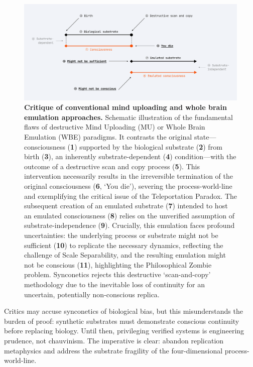 \documentclass[10pt]{article}
\begin{document}
\begin{sloppypar}
  \begin{figure}[ht!]
    \centering
    \includegraphics[width=\textwidth]{figures/mu-wbe-critique.png}
    \caption[Critique of conventional mind uploading and whole brain emulation approaches]{\textbf{Critique of conventional mind uploading and whole brain emulation approaches.} Schematic illustration of the fundamental flaws of destructive Mind Uploading (MU) or Whole Brain Emulation (WBE) paradigms. It contrasts the original state—consciousness (\textbf{1}) supported by the biological substrate (\textbf{2}) from birth (\textbf{3}), an inherently substrate-dependent (\textbf{4}) condition—with the outcome of a destructive scan and copy process (\textbf{5}). This intervention necessarily results in the irreversible termination of the original consciousness (\textbf{6}, ‘You die’), severing the process-world-line and exemplifying the critical issue of the Teleportation Paradox. The subsequent creation of an emulated substrate (\textbf{7}) intended to host an emulated consciousness (\textbf{8}) relies on the unverified assumption of substrate-independence (\textbf{9}). Crucially, this emulation faces profound uncertainties: the underlying process or substrate might not be sufficient (\textbf{10}) to replicate the necessary dynamics, reflecting the challenge of Scale Separability, and the resulting emulation might not be conscious (\textbf{11}), highlighting the Philosophical Zombie problem. Synconetics rejects this destructive ‘scan-and-copy’ methodology due to the inevitable loss of continuity for an uncertain, potentially non-conscious replica.}
    \label{fig:mu-wbe-critique}
  \end{figure}

  Critics may accuse synconetics of biological bias, but this misunderstands the burden of proof: synthetic substrates must demonstrate conscious continuity before replacing biology. Until then, privileging verified systems is engineering prudence, not chauvinism. The imperative is clear: abandon replication metaphysics and address the substrate fragility of the four-dimensional process-world-line.


\end{sloppypar}
\end{document}
